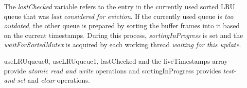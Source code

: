     The \emph{lastChecked} variable refers to the entry in the currently used sorted LRU queue that was \emph{last considered for eviction}. If the currently used queue is \emph{too outdated}, the other queue is prepared by sorting the buffer frames into it based on the current timestamps. During this process, \emph{sortingInProgress} is set and the \emph{waitForSortedMutex} is acquired by each working thread \emph{waiting for this update}.

    useLRUqueue0, useLRUqueue1, lastChecked and the liveTimestamps array provide \emph{atomic read and write} operations and sortingInProgress provides \emph{test-and-set} and \emph{clear} operations.

\begin{@empty}%


\end{@empty}
